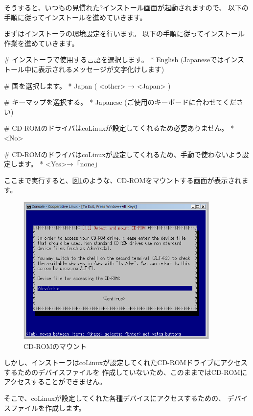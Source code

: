 \documentclass[mingoth,a4paper]{jsarticle}
\begin{document}
そうすると、いつもの見慣れた?インストール画面が起動されますので、
以下の手順に従ってインストールを進めていきます。

まずはインストーラの環境設定を行います。
以下の手順に従ってインストール作業を進めていきます。

\begin{commandline}
# インストーラで使用する言語を選択します。
* English (Japaneseではインストール中に表示されるメッセージが文字化けします)

# 国を選択します。
* Japan ( <other> → <Japan> )

# キーマップを選択する。
* Japanese (ご使用のキーボードに合わせてください)

# CD-ROMのドライバはcoLinuxが設定してくれるため必要ありません。
* <No>

# CD-ROMのドライバはcoLinuxが設定してくれるため、手動で使わないよう設定します。
* <Yes>→「none」
\end{commandline}

ここまで実行すると、図\ref{fig:colinux_cdrom}のような、CD-ROMをマウントする画面が表示されます。

\begin{figure}[htbp]
 \begin{center}
  \includegraphics[width=100mm]{image200808/colinux_cdrom.png}
 \end{center}
 \caption{CD-ROMのマウント}
 \label{fig:colinux_cdrom}
\end{figure}

しかし、インストーラはcoLinuxが設定してくれたCD-ROMドライブにアクセスするためのデバイスファイルを
作成していないため、このままではCD-ROMにアクセスすることができません。

そこで、coLinuxが設定してくれた各種デバイスにアクセスするための、
デバイスファイルを作成します。
\end{document}
